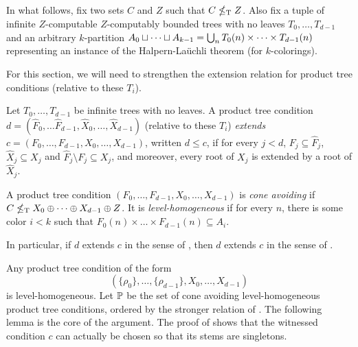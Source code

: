 
In what follows, fix two sets $C$ and $Z$ such that $C \nleq_{\text{\upshape T}} Z$.
Also fix a tuple of infinite $Z$-computable $Z$-computably bounded trees with no leaves $T_0, \dots, T_{d-1}$ and an arbitrary $k$-partition $A_0 \sqcup \dots \sqcup A_{k-1} = \bigcup_n {T}_0(n) \times \dots \times {T}_{d-1}(n)$ representing an instance of the Halpern-La\"{u}chli theorem (for $k$-colorings).

For this section, we will need to strengthen the extension relation for product tree conditions (relative to these $T_i$).

\begin{definition}\label{def:strong-product-tree-extension}
Let $T_0,\ldots,T_{d-1}$ be infinite trees with no leaves. A product tree condition $d = (\hat{F}_0, \dots \hat{F}_{d-1}, \hat{X}_0, \dots, \hat{X}_{d-1})$ (relative to these $T_i$) \emph{extends} $c = (F_0, \dots, F_{d-1}, X_0, \dots, X_{d-1})$, written $d \leq c$,  if for every $j < d$, $F_j \subseteq \hat{F}_j$, $\hat{X}_j \subseteq X_j$ and $\hat{F}_j \setminus F_j \subseteq X_j$, and moreover, every root of $X_j$ is extended by a root of $\hat{X}_j$.
\end{definition}

\begin{definition}\label{def:levhom3}
A product tree condition $(F_0, \dots, F_{d-1}, X_0, \dots, X_{d-1})$ is \emph{cone avoiding} if $C \nleq_{\text{\upshape T}} X_0 \oplus \dots \oplus X_{d-1} \oplus Z$. It is \emph{level-homogeneous} if for every $n$, there is some color $i < k$ such that $F_0(n) \times \dots \times F_{d-1}(n) \subseteq A_i$.
\end{definition}

\noindent In particular, if $d$ extends $c$ in the sense of ,
then $d$ extends $c$ in the sense of .

Any product tree condition of the form
$$
(\{\rho_0\}, \dots, \{\rho_{d-1}\}, X_0,  \dots, X_{d-1})
$$
is level-homogeneous. Let $\mathbb{P}$ be the set of cone avoiding level-homogeneous product tree conditions, ordered by the stronger relation of .
The following lemma is the core of the argument. The proof of  shows that the witnessed condition $c$ can actually be chosen so that its stems are singletons.

